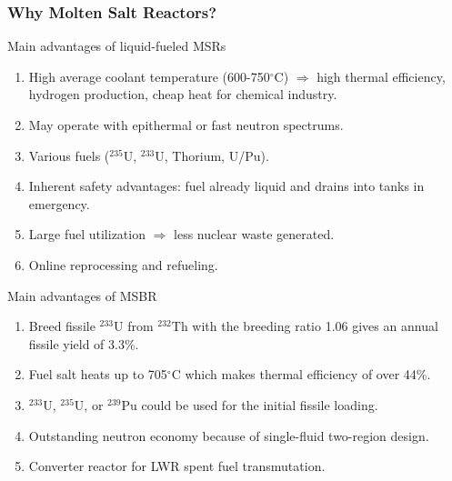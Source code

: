 \begin{frame}
  \frametitle{Why Molten Salt Reactors?}
                  \vspace*{-0.1in}
              \begin{block}{Main advantages of liquid-fueled \glspl{MSR}}
               \begin{enumerate}
               \item High average coolant temperature (600-750$^{\circ}$C) $\Rightarrow$ high thermal efficiency, hydrogen production, cheap heat for chemical industry.
                \item May operate with epithermal or fast neutron spectrums.
                \item Various fuels ($^{235}$U, $^{233}$U, Thorium, U/Pu).
                \item Inherent safety advantages: fuel already liquid and drains into tanks in emergency.
                \item Large fuel utilization $\Rightarrow$ less nuclear waste generated.
                \item Online reprocessing and refueling.
               \end{enumerate}
               \end{block}
               
               \begin{block}{Main advantages of \gls{MSBR}}
               \begin{enumerate}
                \item Breed fissile $^{233}$U from $^{232}$Th with the breeding ratio 1.06 gives an annual 
                fissile yield of 3.3\%.
                \item Fuel salt heats up to 705$^{\circ}$C which makes thermal efficiency of over 44\%.
                \item $^{233}$U, $^{235}$U, or $^{239}$Pu could be used for the initial fissile loading.
                \item Outstanding neutron economy because of single-fluid two-region design.
                \item Converter reactor for \gls{LWR} spent fuel transmutation.
               \end{enumerate}
               \end{block}

\end{frame}

